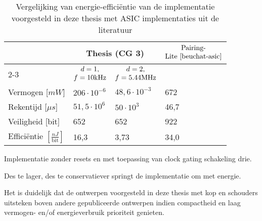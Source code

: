 \begin{table}[h]
	\caption{Vergelijking van energie-effici\"entie van de implementatie voorgesteld in deze thesis met ASIC implementaties uit de literatuur}
	\label{tabel-resultaten-energie}

	\begin{narrow}{-2cm}{-2cm}
		\centering
		\begin{tabular}{llll}
			\toprule
			&	\multicolumn{2}{c}{Thesis (CG 3)\footnotemark[2]}	& \multirow{3}{*}{$\begin{array}{@{}c@{}}\text{Pairing-}\\\text{Lite \cite{beuchat-asic}}\end{array}$}\\
			\cmidrule(r){2-3}
			& \multicolumn{1}{c}{$\begin{array}{@{}c@{}}d = 1,\\f = 10\text{kHz}\end{array}$} & \multicolumn{1}{c}{$\begin{array}{@{}c@{}}d = 2,\\f = 5.44\text{MHz}\end{array}$} &\\
	 		\midrule
			Vermogen [$mW$]																& $206 \cdot 10^{-6}$		& $48,6 \cdot 10^{-3}$		& 672\\
			Rekentijd [$\mu s$]															& $51,5 \cdot 10^6$			& $50 \cdot 10^3$				& 46,7\\
			Veiligheid [bit]																& 652								& 652								& 922\\
			Effici\"entie $\left[ \frac{nJ}{\text{bit}}\right]$\footnotemark[3]	& 16,3					& 3,73							& 34,0\\
			\bottomrule		
		\end{tabular}
	\end{narrow}
		
	\footnotesize \footnotemark[2] Implementatie zonder resets en met toepassing van clock gating schakeling drie.
	
	\footnotemark[3] Des te lager, des te conservatiever springt de implementatie om met energie.
\end{table}

Het is duidelijk dat de ontwerpen voorgesteld in deze thesis met kop en schouders uitsteken boven andere gepubliceerde ontwerpen indien compactheid en laag vermogen- en/of energieverbruik prioriteit genieten.
